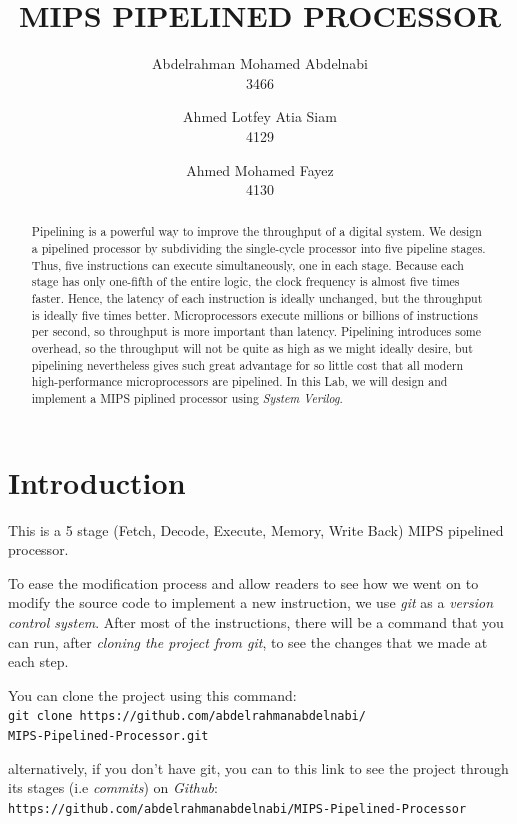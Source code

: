 \documentclass[titlepage,12pt,oneside,a4paper]{article}
\title{MIPS PIPELINED PROCESSOR}
\author{
	Abdelrahman Mohamed Abdelnabi\\
	3466
	\and
	Ahmed Lotfey Atia Siam \\
	4129
	\and
	Ahmed Mohamed Fayez \\
	4130
}
\newcommand{\code}[1]{{\texttt{#1}}}
\begin{document}
\maketitle

\begin{abstract}
	Pipelining is a powerful way to improve the	throughput of a digital system. We design a pipelined processor by subdividing the single-cycle processor into five pipeline stages. Thus, five instructions can execute simultaneously, one in each stage. Because each stage has only one-fifth of the entire logic, the clock frequency is almost five times faster. Hence, the latency of each instruction is ideally unchanged, but the throughput is ideally five times better. Microprocessors execute millions or billions of instructions per second, so throughput is more important than latency. Pipelining introduces some overhead, so the throughput will not be quite as high as we might ideally desire, but pipelining nevertheless gives such great advantage for so little cost that all modern high-performance microprocessors are pipelined. In this Lab, we will design and implement a MIPS piplined  processor using\textit{ System Verilog}.
\end{abstract}



\section{Introduction}
This is a 5 stage (Fetch, Decode, Execute, Memory, Write Back) MIPS pipelined processor.

To ease the modification process and allow readers to see how we went on to modify the source code to implement a new instruction, we use \textit{git} as a \textit{version control system}. After most of the instructions, there will be a command that you can run, after \textit{cloning the project from git}, to see the changes that we made at each step.

You can clone the project using this command:\\
\code{git clone https://github.com/abdelrahmanabdelnabi/\\MIPS-Pipelined-Processor.git}

alternatively, if you don't have git, you can to this link to see the project through its stages (i.e \textit{commits}) on \textit{Github}:\\
\code{https://github.com/abdelrahmanabdelnabi/MIPS-Pipelined-Processor}
\end{document}
